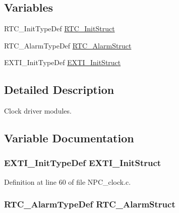 \subsection*{Variables}
\begin{DoxyCompactItemize}
\item 
R\+T\+C\+\_\+\+Init\+Type\+Def \hyperlink{group___clock_gabd73cfb4bb5c20ec4524dd5fe244842b}{R\+T\+C\+\_\+\+Init\+Struct}
\item 
R\+T\+C\+\_\+\+Alarm\+Type\+Def \hyperlink{group___clock_ga64d4fe2aa4668079f349f9eb97a48e35}{R\+T\+C\+\_\+\+Alarm\+Struct}
\item 
E\+X\+T\+I\+\_\+\+Init\+Type\+Def \hyperlink{group___clock_gaf0f09eb6c46f0a7cc5f7736c709a8c77}{E\+X\+T\+I\+\_\+\+Init\+Struct}
\end{DoxyCompactItemize}


\subsection{Detailed Description}
Clock driver modules. 



\subsection{Variable Documentation}
\subsubsection[{\texorpdfstring{E\+X\+T\+I\+\_\+\+Init\+Struct}{EXTI_InitStruct}}]{\setlength{\rightskip}{0pt plus 5cm}E\+X\+T\+I\+\_\+\+Init\+Type\+Def E\+X\+T\+I\+\_\+\+Init\+Struct}\hypertarget{group___clock_gaf0f09eb6c46f0a7cc5f7736c709a8c77}{}\label{group___clock_gaf0f09eb6c46f0a7cc5f7736c709a8c77}


Definition at line 60 of file N\+P\+C\+\_\+clock.\+c.

\subsubsection[{\texorpdfstring{R\+T\+C\+\_\+\+Alarm\+Struct}{RTC_AlarmStruct}}]{\setlength{\rightskip}{0pt plus 5cm}R\+T\+C\+\_\+\+Alarm\+Type\+Def R\+T\+C\+\_\+\+Alarm\+Struct}\hypertarget{group___clock_ga64d4fe2aa4668079f349f9eb97a48e35}{}\label{group___clock_ga64d4fe2aa4668079f349f9eb97a48e35}


